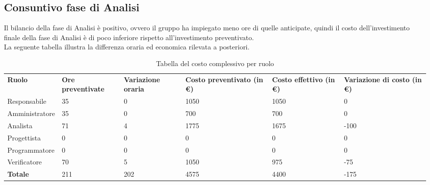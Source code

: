 \subsection{Consuntivo fase di Analisi}
Il bilancio della fase di Analisi è positivo, ovvero il gruppo ha impiegato meno ore di quelle anticipate, quindi il costo dell'investimento finale della fase di Analisi è di poco inferiore rispetto all'investimento preventivato.\\
La seguente tabella illustra la differenza oraria ed economica rilevata a posteriori.
{
\renewcommand{\arraystretch}{2}
\begin{longtable}[h]{ C{2.5cm} C{2cm} C{1.8cm} C{2.2cm} C{1.5cm} C{2.3cm}}
\caption{Tabella del costo complessivo per ruolo}\\
\rowcolor{\primaryColor}

\textcolor{\secondaryColor}{\textbf{Ruolo}} & 
\textcolor{\secondaryColor}{\textbf{Ore preventivate}} & 
\textcolor{\secondaryColor}{\textbf{Variazione oraria}} & 
\textcolor{\secondaryColor}{\textbf{Costo preventivato (in \euro{})}} & 
\textcolor{\secondaryColor}{\textbf{Costo effettivo (in \euro{})}} & 
\textcolor{\secondaryColor}{\textbf{Variazione di costo (in \euro{})}}\\	
	
Responsabile    &  35 & 0 & 1050 & 1050 &  0 \\
Amministratore  &  35 & 0 & 700 & 700 & 0 \\
Analista        & 71 & 4 & 1775 & 1675 & -100 \\
Progettista     &   0 &   0 &    0 &  0 & 0 \\
Programmatore   &   0 &   0 &    0 &  0 & 0 \\
Verificatore    &  70 &  5 & 1050 & 975 & -75 \\
\textbf{Totale} & 211 & 202 & 4575 & 4400 & -175 \\	

\end{longtable}
}

